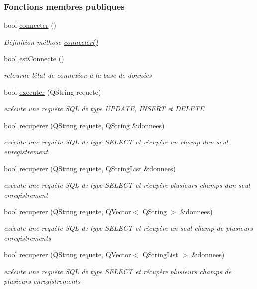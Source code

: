 \subsubsection*{Fonctions membres publiques}
\begin{DoxyCompactItemize}
\item 
bool \hyperlink{class_bdd_a1a234e773787295f521d66685149176b}{connecter} ()
\begin{DoxyCompactList}\small\item\em Définition méthose \hyperlink{class_bdd_a1a234e773787295f521d66685149176b}{connecter()} \end{DoxyCompactList}\item 
bool \hyperlink{class_bdd_afeb7ee6793705cb94a94560fd53e3e9d}{est\+Connecte} ()
\begin{DoxyCompactList}\small\item\em retourne l\textquotesingle{}état de connexion à la base de données \end{DoxyCompactList}\item 
bool \hyperlink{class_bdd_ab6ae645b4b54ce5df8dc9b422fb39faa}{executer} (Q\+String requete)
\begin{DoxyCompactList}\small\item\em exécute une requête S\+QL de type U\+P\+D\+A\+TE, I\+N\+S\+E\+RT et D\+E\+L\+E\+TE \end{DoxyCompactList}\item 
bool \hyperlink{class_bdd_a8f25d29d309041bbf875700db0efd97b}{recuperer} (Q\+String requete, Q\+String \&donnees)
\begin{DoxyCompactList}\small\item\em exécute une requête S\+QL de type S\+E\+L\+E\+CT et récupère un champ d\textquotesingle{}un seul enregistrement \end{DoxyCompactList}\item 
bool \hyperlink{class_bdd_a397b32b8bc612aadf95bf0595e37ec7c}{recuperer} (Q\+String requete, Q\+String\+List \&donnees)
\begin{DoxyCompactList}\small\item\em exécute une requête S\+QL de type S\+E\+L\+E\+CT et récupère plusieurs champs d\textquotesingle{}un seul enregistrement \end{DoxyCompactList}\item 
bool \hyperlink{class_bdd_ae155534b5b1a9daa94ee2106fcf0f37d}{recuperer} (Q\+String requete, Q\+Vector$<$ Q\+String $>$ \&donnees)
\begin{DoxyCompactList}\small\item\em exécute une requête S\+QL de type S\+E\+L\+E\+CT et récupère un seul champ de plusieurs enregistrements \end{DoxyCompactList}\item 
bool \hyperlink{class_bdd_a482cd502a23b933712400044e1ba3e37}{recuperer} (Q\+String requete, Q\+Vector$<$ Q\+String\+List $>$ \&donnees)
\begin{DoxyCompactList}\small\item\em exécute une requête S\+QL de type S\+E\+L\+E\+CT et récupère plusieurs champs de plusieurs enregistrements \end{DoxyCompactList}\end{DoxyCompactItemize}
